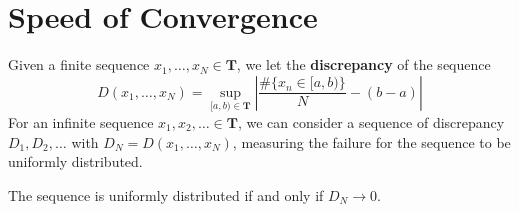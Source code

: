 \section{Speed of Convergence}

Given a finite sequence $x_1, \dots, x_N \in \mathbf{T}$, we let the {\bf discrepancy} of the sequence
%
\[ D(x_1, \dots, x_N) = \sup_{[a,b) \in \mathbf{T}} \left| \frac{\# \{ x_n \in [a,b) \}}{N} - (b - a) \right| \]
%
For an infinite sequence $x_1, x_2, \dots \in \mathbf{T}$, we can consider a sequence of discrepancy $D_1, D_2, \dots$ with $D_N = D(x_1, \dots, x_N)$, measuring the failure for the sequence to be uniformly distributed.

\begin{theorem}
    The sequence is uniformly distributed if and only if $D_N \to 0$.
\end{theorem}

